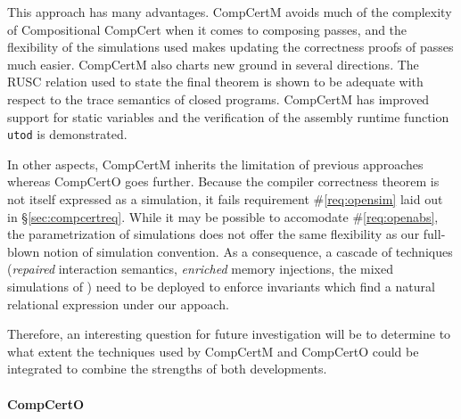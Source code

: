 \documentclass[draft,11pt]{report}
\begin{document}
This approach has many advantages.
CompCertM avoids much of the complexity
of Compositional CompCert
when it comes to composing passes,
and the flexibility of the simulations used
makes updating the correctness proofs of passes much easier.
CompCertM also charts new ground in several directions.
The RUSC relation used to state the final theorem
is shown to be adequate with respect to the trace semantics
of closed programs.
CompCertM has improved support for static variables
and the verification of
the assembly runtime function \texttt{utod} is demonstrated.

In other aspects,
CompCertM inherits the limitation of previous approaches
whereas CompCertO goes further.
Because the compiler correctness theorem
is not itself expressed as a simulation,
it fails requirement \#\ref{req:opensim}
laid out in \S\ref{sec:compcertreq}.
While it may be possible to accomodate \#\ref{req:openabs},
the parametrization of simulations
does not offer the same flexibility as
our full-blown notion of simulation convention.
As a consequence, a cascade of techniques
(\emph{repaired} interaction semantics,
\emph{enriched} memory injections,
the mixed simulations of \cite{pilsner})
need to be deployed to enforce invariants
which find a natural relational expression
under our appoach.

Therefore,
an interesting question for future investigation
will be to determine to what extent
the techniques used by CompCertM and CompCertO
could be integrated to combine
the strengths of both developments.


\paragraph{CompCertO}
\end{document}
